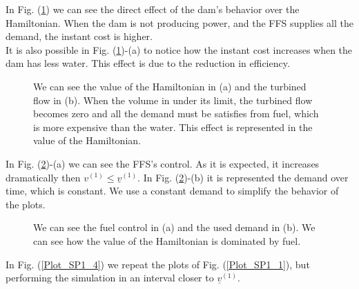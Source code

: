 In Fig. (\ref{Plot_SP1_2}) we can see the direct effect of the dam's behavior over the Hamiltonian. When the dam is not producing power, and the FFS supplies all the demand, the instant cost is higher.\\
It is also possible in Fig. (\ref{Plot_SP1_2})-(a) to notice how the instant cost increases when the dam has less water. This effect is due to the reduction in efficiency.

\begin{figure}[H]
\centering
{}\qquad
{}
\caption{We can see the value of the Hamiltonian in (a) and the turbined flow in (b). When the volume in under its limit, the turbined flow becomes zero and all the demand must be satisfies from fuel, which is more expensive than the water. This effect is represented in the value of the Hamiltonian.}
\label{Plot_SP1_2}
\end{figure}

In Fig. (\ref{Plot_SP1_3})-(a) we can see the FFS's control. As it is expected, it increases dramatically then $v^{(1)}\leq\underline{v}^{(1)}$. In Fig. (\ref{Plot_SP1_3})-(b) it is represented the demand over time, which is constant. We use a constant demand to simplify the behavior of the plots.

\begin{figure}[H]
\centering
{}\qquad
{}
\caption{We can see the fuel control in (a) and the used demand in (b). We can see how the value of the Hamiltonian is dominated by fuel.}
\label{Plot_SP1_3}
\end{figure}

In Fig. (\ref{Plot_SP1_4}) we repeat the plots of Fig. (\ref{Plot_SP1_1}), but performing the simulation in an interval closer to $\underline{v}^{(1)}$.

